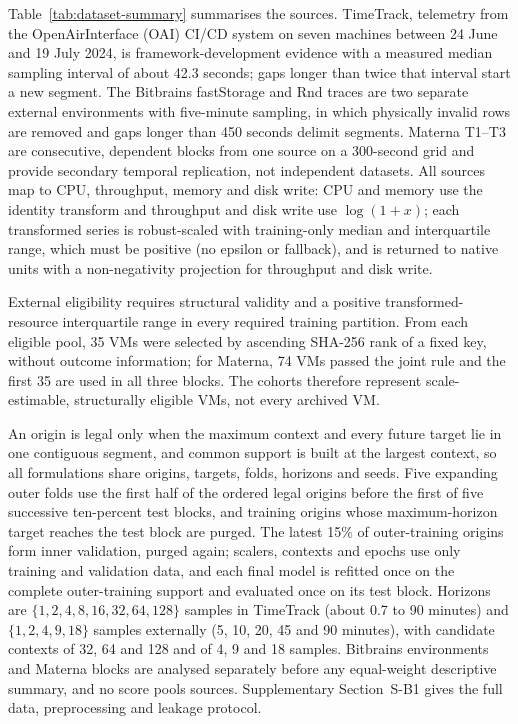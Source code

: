 \documentclass[5p,twocolumn]{elsarticle}
\begin{document}
Table~\ref{tab:dataset-summary} summarises the sources. TimeTrack, telemetry
from the OpenAirInterface (OAI) CI/CD system on seven machines between
24 June and 19 July 2024, is framework-development evidence with a measured
median sampling interval of about 42.3 seconds; gaps longer than twice that
interval start a new segment. The Bitbrains fastStorage and Rnd traces are two separate
external environments with five-minute sampling, in which physically invalid
rows are removed and gaps longer than 450 seconds delimit segments. Materna
T1--T3 are consecutive, dependent blocks from one source on a 300-second grid
and provide secondary temporal replication, not independent datasets. All
sources map to CPU, throughput, memory and disk write: CPU and memory use the
identity transform and throughput and disk write use $\log(1+x)$; each
transformed series is robust-scaled with training-only median and
interquartile range, which must be positive (no epsilon or fallback), and is
returned to native units with a non-negativity projection for throughput and
disk write.

External eligibility requires structural validity and a positive
transformed-resource interquartile range in every required training
partition. From each eligible pool, 35 VMs were selected by ascending SHA-256
rank of a fixed key, without outcome information; for Materna, 74 VMs passed
the joint rule and the first 35 are used in all three blocks. The cohorts
therefore represent scale-estimable, structurally eligible VMs, not every
archived VM.

An origin is legal only when the maximum context and every future target lie
in one contiguous segment, and common support is built at the largest
context, so all formulations share origins, targets, folds, horizons and
seeds. Five expanding outer folds use the first half of the ordered legal
origins before the first of five successive ten-percent test blocks, and
training origins whose maximum-horizon target reaches the test block are
purged. The latest 15\% of outer-training origins form inner validation,
purged again; scalers, contexts and epochs use only training and validation
data, and each final model is refitted once on the complete outer-training
support and evaluated once on its test block. Horizons are
$\{1,2,4,8,16,32,64,128\}$ samples in TimeTrack (about 0.7 to 90
minutes) and $\{1,2,4,9,18\}$ samples externally (5, 10, 20, 45 and 90
minutes), with candidate contexts of 32, 64 and 128 and of 4, 9 and 18
samples. Bitbrains environments and Materna blocks are analysed separately
before any equal-weight descriptive summary, and no score pools sources.
Supplementary Section~S-B1 gives the full data, preprocessing and leakage
protocol.
\end{document}
